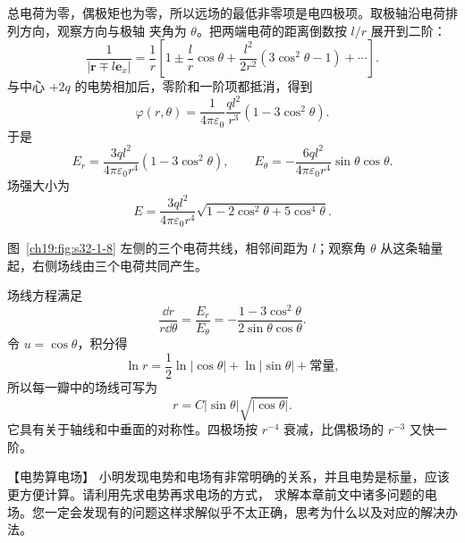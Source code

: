 \begin{xesolution}
总电荷为零，偶极矩也为零，所以远场的最低非零项是电四极项。取极轴沿电荷排列方向，观察方向与极轴
夹角为 $\theta$。把两端电荷的距离倒数按 $l/r$ 展开到二阶：
\[
  \frac1{|\boldsymbol r\mp l\boldsymbol e_x|}
  =\frac1r\left[1\pm\frac lr\cos\theta
  +\frac{l^2}{2r^2}(3\cos^2\theta-1)+\cdots\right].
\]
与中心 $+2q$ 的电势相加后，零阶和一阶项都抵消，得到
\[
  \boxed{\varphi(r,\theta)=\frac{1}{4\pi\varepsilon_0}
  \frac{ql^2}{r^3}(1-3\cos^2\theta)}.
\]
于是
\[
  \boxed{E_r=\frac{3ql^2}{4\pi\varepsilon_0r^4}(1-3\cos^2\theta)},
  \qquad
  \boxed{E_\theta=-\frac{6ql^2}{4\pi\varepsilon_0r^4}\sin\theta\cos\theta}.
\]
场强大小为
\[
  \boxed{E=\frac{3ql^2}{4\pi\varepsilon_0r^4}
  \sqrt{1-2\cos^2\theta+5\cos^4\theta}}.
\]

图~\ref{ch19:fig:s32-1-8} 左侧的三个电荷共线，相邻间距为 $l$；观察角 $\theta$ 从这条轴量起，右侧场线由三个电荷共同产生。

\par\noindent\begin{minipage}{\linewidth}
\quadrupoleFarFigure
{}\label{ch19:fig:s32-1-8}
\end{minipage}\par\medskip

场线方程满足
\[
  \frac{\dd r}{r\dd\theta}
  =\frac{E_r}{E_\theta}
  =-\frac{1-3\cos^2\theta}{2\sin\theta\cos\theta}.
\]
令 $u=\cos\theta$，积分得
\[
  \ln r=\frac12\ln|\cos\theta|+\ln|\sin\theta|+\text{常量},
\]
所以每一瓣中的场线可写为
\[
  \boxed{r=C|\sin\theta|\sqrt{|\cos\theta|}}.
\]
它具有关于轴线和中垂面的对称性。四极场按 $r^{-4}$ 衰减，比偶极场的 $r^{-3}$ 又快一阶。
\end{xesolution}
\begin{origexamplebox}{【电势算电场】}\label{ch19:ex:s33-2-1}
小明发现电势和电场有非常明确的关系，并且电势是标量，应该更方便计算。请利用先求电势再求电场的方式，
求解本章前文中诸多问题的电场。您一定会发现有的问题这样求解似乎不太正确，思考为什么以及对应的解决办法。

\ThQPotential
\end{origexamplebox}\par\nopagebreak[4]

